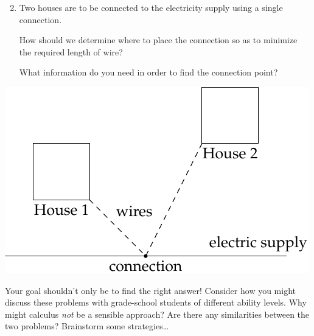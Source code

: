 \begin{minipage}[t]{0.51\linewidth}\vspace{0pt}
	\begin{enumerate}\setcounter{enumi}{1}
	  \item Two houses are to be connected to the electricity supply using a single connection.\par
	  How should we determine where to place the connection so as to minimize the required length of wire?\par
	  What information do you need in order to find the connection point?
	\end{enumerate}
\end{minipage}
\hfill
\begin{minipage}[t]{0.48\linewidth}\vspace{0pt}
	\flushright
	\includegraphics[scale=0.9]{intro-elec}
\end{minipage}
\medbreak


Your goal shouldn't only be to find the right answer! Consider how you might discuss these problems with grade-school students of different ability levels. Why might calculus \emph{not} be a sensible approach? Are there any similarities between the two problems? Brainstorm some strategies\ldots


\goodbreak



